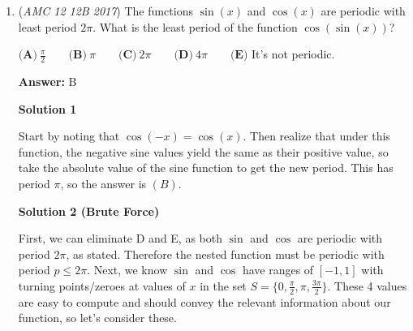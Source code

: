 \begin{enumerate}
\textbf{Solution 1}

Because the two points are on a diameter, the center must be halfway between them at the point $(4,3)$. The distance from $(0,0)$ to $(4,3)$ is 5 so the circle has radius 5. Thus, the equation of the circle is $(x-4)^2+(y-3)^2=25$. 

 To find the x-intercept, y must be 0, so $(x-4)^2+(0-3)^2=25$, so $(x-4)^2=16$, $x-4=4$, $x=8, \boxed{D}$.

 Written by: SilverLion

 



\textbf{Solution 2 (Brute Force)}

As in solution 1, we find that the midpoint of the circle is (4,3) by finding half of the x and y coordinates of (8,6) point. We see a 3-4-5 triangle! For a point to be on the circle, it has to be 5 units away from the center.

 We are able to create another 3-4-5 triangle by drawing a segment from (4,3) to (0,8). Therefore we know our answer is $\boxed{D}$

 \href{https://www.geogebra.org/geometry/xryzxpyw}{https://www.geogebra.org/geometry/xryzxpyw}

 -thedodecagon

 


	\item (\textit{AMC 12 12B 2017}) The functions $\sin(x)$ and $\cos(x)$ are periodic with least period $2\pi$. What is the least period of the function $\cos(\sin(x))$?


 $\textbf{(A)}\ \frac{\pi}{2}\qquad\textbf{(B)}\ \pi\qquad\textbf{(C)}\ 2\pi \qquad\textbf{(D)}\ 4\pi \qquad\textbf{(E)}$ It's not periodic.


 
 \textbf{Answer: }B



\textbf{Solution 1}

Start by noting that $\cos(-x)=\cos(x)$. Then realize that under this function, the negative sine values yield the same as their positive value, so take the absolute value of the sine function to get the new period. This has period $\pi$, so the answer is $\boxed{(B)}$.

 



\textbf{Solution 2 (Brute Force)}

First, we can eliminate D and E, as both $\sin$ and $\cos$ are periodic with period $2\pi$, as stated. Therefore the nested function must be periodic with period $p \le 2\pi$. Next, we know $\sin$ and $\cos$ have ranges of $[-1, 1]$ with turning points/zeroes at values of $x$ in the set $S = \{0, \frac{\pi}{2}, \pi, \frac{3\pi}{2}\}$. These 4 values are easy to compute and should convey the relevant information about our function, so let's consider these.


\end{enumerate}
